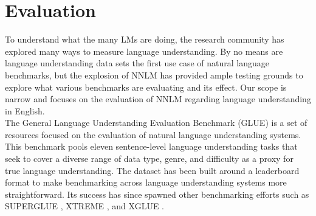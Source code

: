 \section{Evaluation}
\label{chap:prior:sec:eval}
To understand what the many LMs are doing, the research community has explored many ways to measure language understanding. By no means are language understanding data sets the first use case of natural language benchmarks, but the explosion of NNLM has provided ample testing grounds to explore what various benchmarks are evaluating and its effect. Our scope is narrow and focuses on the evaluation of NNLM regarding language understanding in English. \\
The General Language Understanding Evaluation Benchmark (GLUE) \cite{Wang2018GLUEAM} is a set of resources focused on the evaluation of natural language understanding systems. This benchmark pools eleven sentence-level language understanding tasks that seek to cover a diverse range of data type, genre, and difficulty as a proxy for true language understanding. The dataset has been built around a leaderboard format to make benchmarking across language understanding systems more straightforward. Its success has since spawned other benchmarking efforts such as SUPERGLUE \cite{Wang2019SuperGLUEAS}, XTREME \cite{Hu2020XTREMEAM}, and XGLUE \cite{Liang2020XGLUEAN}. \\
